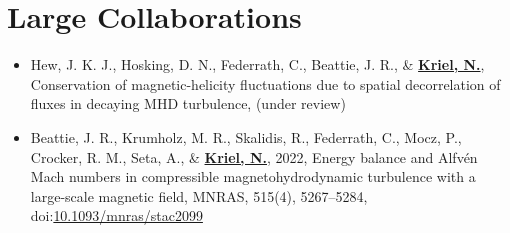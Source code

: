 \section*{Large Collaborations}

\begin{itemize}
  \item Hew, J. K. J., Hosking, D. N., Federrath, C., Beattie, J. R., \& \underline{\textbf{Kriel, N.}},
  Conservation of magnetic-helicity fluctuations due to spatial decorrelation of fluxes in decaying MHD turbulence,
  (under review)

  \item Beattie, J. R., Krumholz, M. R., Skalidis, R., Federrath, C., Mocz, P., Crocker, R. M., Seta, A., \& \underline{\textbf{Kriel, N.}}, 2022,
  Energy balance and Alfv\'en Mach numbers in compressible magnetohydrodynamic turbulence with a large-scale magnetic field,
  MNRAS, 515(4), 5267–5284, doi:\href{https://doi.org/10.1093/mnras/stac2099}{10.1093/mnras/stac2099}
\end{itemize}
